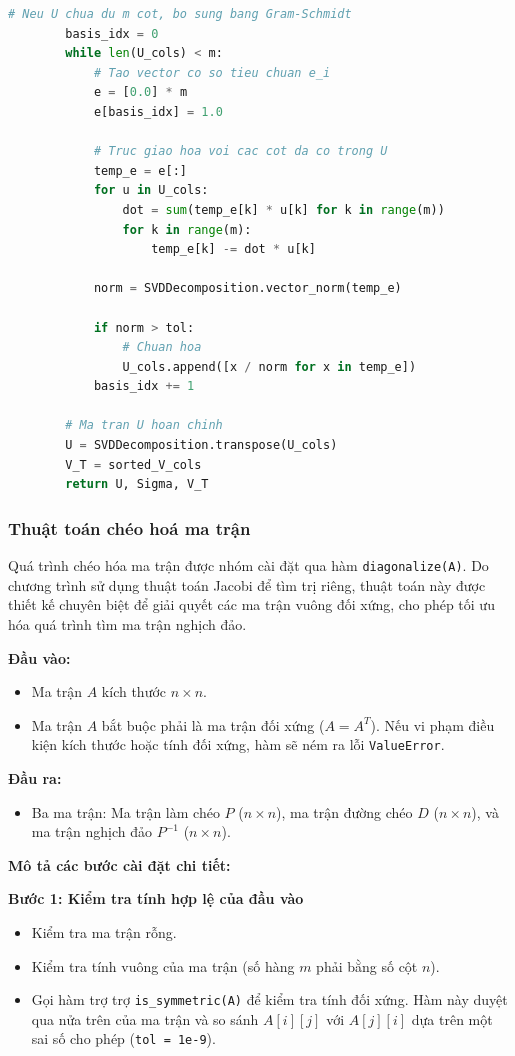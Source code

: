 \documentclass[a4paper]{article}
\begin{document}
\begin{lstlisting}[language=Python, caption={Hàm phân rã ma trận SVD - decomposition.py}]
        # Neu U chua du m cot, bo sung bang Gram-Schmidt
        basis_idx = 0
        while len(U_cols) < m:
            # Tao vector co so tieu chuan e_i
            e = [0.0] * m
            e[basis_idx] = 1.0

            # Truc giao hoa voi cac cot da co trong U
            temp_e = e[:]
            for u in U_cols:
                dot = sum(temp_e[k] * u[k] for k in range(m))
                for k in range(m):
                    temp_e[k] -= dot * u[k]

            norm = SVDDecomposition.vector_norm(temp_e)

            if norm > tol:
                # Chuan hoa 
                U_cols.append([x / norm for x in temp_e])
            basis_idx += 1

        # Ma tran U hoan chinh
        U = SVDDecomposition.transpose(U_cols)
        V_T = sorted_V_cols
        return U, Sigma, V_T

\end{lstlisting}

\subsubsection{Thuật toán chéo hoá ma trận}

Quá trình chéo hóa ma trận được nhóm cài đặt qua hàm \texttt{diagonalize(A)}. Do chương trình sử dụng thuật toán Jacobi để tìm trị riêng, thuật toán này được thiết kế chuyên biệt để giải quyết các ma trận vuông đối xứng, cho phép tối ưu hóa quá trình tìm ma trận nghịch đảo.

\textbf{Đầu vào: }
\begin{itemize}
    \item Ma trận $A$ kích thước $n \times n$. 
    \item Ma trận $A$ bắt buộc phải là ma trận đối xứng ($A = A^T$). Nếu vi phạm điều kiện kích thước hoặc tính đối xứng, hàm sẽ ném ra lỗi \texttt{ValueError}.
\end{itemize}

\textbf{Đầu ra: }
\begin{itemize}
    \item Ba ma trận: Ma trận làm chéo $P$ ($n \times n$), ma trận đường chéo $D$ ($n \times n$), và ma trận nghịch đảo $P^{-1}$ ($n \times n$).
\end{itemize}

\textbf{Mô tả các bước cài đặt chi tiết:}

\textbf{Bước 1: Kiểm tra tính hợp lệ của đầu vào}
\begin{itemize}
    \item Kiểm tra ma trận rỗng.
    \item Kiểm tra tính vuông của ma trận (số hàng $m$ phải bằng số cột $n$).
    \item Gọi hàm trợ trợ \texttt{is\_symmetric(A)} để kiểm tra tính đối xứng. Hàm này duyệt qua nửa trên của ma trận và so sánh $A[i][j]$ với $A[j][i]$ dựa trên một sai số cho phép (\texttt{tol = 1e-9}).
\end{itemize}
\end{document}
